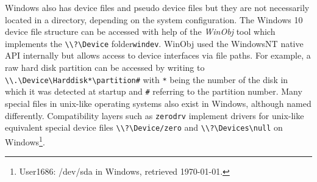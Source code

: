 Windows also has device files and pseudo device files but they are not necessarily located in a directory, depending
on the system configuration. The Windows 10 device file structure can be accessed with help of the \textit{WinObj} tool which
implements the \texttt{\textbackslash \textbackslash ?\textbackslash Device} folder\texttt{windev}. WinObj used the WindowsNT native API internally but allows access to device interfaces
via file paths. For example, a raw hard disk partition can be accessed by writing to \texttt{\textbackslash \textbackslash .\textbackslash Device\textbackslash Harddisk*\textbackslash partition\#}
with \texttt{*} being the number of the disk in which it was detected at startup and \texttt{\#} referring to the partition number.
Many special files in unix-like operating systems also exist in Windows, although named differently. Compatibility layers
such as \texttt{zerodrv} implement drivers for unix-like equivalent special device files \texttt{\textbackslash \textbackslash ?\textbackslash Device/zero} and \texttt{\textbackslash \textbackslash ?\textbackslash Devices\textbackslash null}
on Windows\footnote{ User1686: /dev/sda in Windows, retrieved \today.}.


